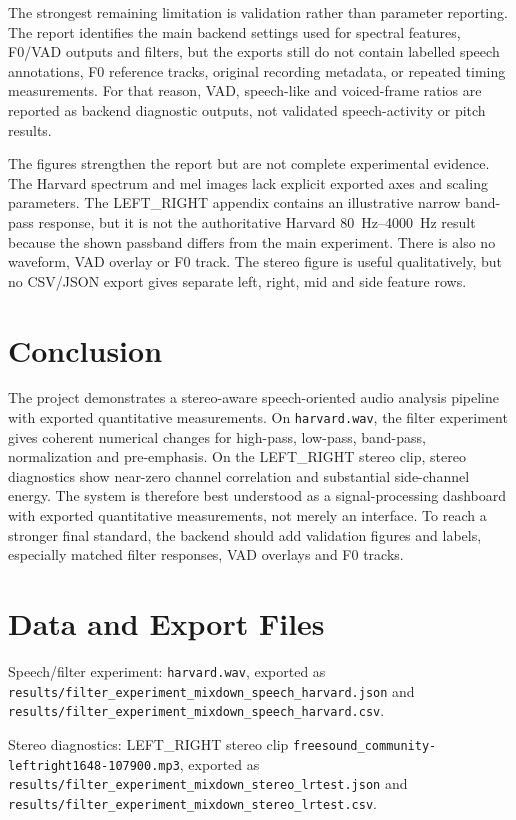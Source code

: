 \documentclass[11pt,a4paper]{article}
\begin{document}
The strongest remaining limitation is validation rather than parameter reporting. The report identifies the main backend settings used for spectral features, F0/VAD outputs and filters, but the exports still do not contain labelled speech annotations, F0 reference tracks, original recording metadata, or repeated timing measurements. For that reason, VAD, speech-like and voiced-frame ratios are reported as backend diagnostic outputs, not validated speech-activity or pitch results.

The figures strengthen the report but are not complete experimental evidence. The Harvard spectrum and mel images lack explicit exported axes and scaling parameters. The LEFT\_RIGHT appendix contains an illustrative narrow band-pass response, but it is not the authoritative Harvard \SIrange{80}{4000}{Hz} result because the shown passband differs from the main experiment. There is also no waveform, VAD overlay or F0 track. The stereo figure is useful qualitatively, but no CSV/JSON export gives separate left, right, mid and side feature rows.

\section{Conclusion}

The project demonstrates a stereo-aware speech-oriented audio analysis pipeline with exported quantitative measurements. On \texttt{harvard.wav}, the filter experiment gives coherent numerical changes for high-pass, low-pass, band-pass, normalization and pre-emphasis. On the LEFT\_RIGHT stereo clip, stereo diagnostics show near-zero channel correlation and substantial side-channel energy. The system is therefore best understood as a signal-processing dashboard with exported quantitative measurements, not merely an interface. To reach a stronger final standard, the backend should add validation figures and labels, especially matched filter responses, VAD overlays and F0 tracks.

\appendix
\section{Data and Export Files}

Speech/filter experiment: \texttt{harvard.wav}, exported as \texttt{results/filter\_experiment\_mixdown\_speech\_harvard.json} and \texttt{results/filter\_experiment\_mixdown\_speech\_harvard.csv}.

Stereo diagnostics: LEFT\_RIGHT stereo clip \texttt{freesound\_community-leftright1648-107900.mp3}, exported as \texttt{results/filter\_experiment\_mixdown\_stereo\_lrtest.json} and \texttt{results/filter\_experiment\_mixdown\_stereo\_lrtest.csv}.
\end{document}

